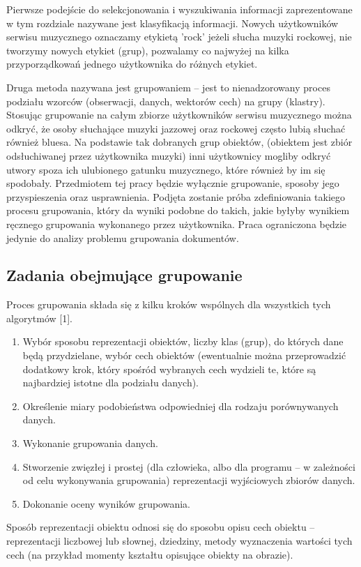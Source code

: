 \documentclass{article}
\begin{document}
Pierwsze podejście do selekcjonowania i wyszukiwania informacji zaprezentowane w tym rozdziale nazywane jest klasyfikacją informacji. Nowych użytkowników serwisu muzycznego oznaczamy etykietą 'rock' jeżeli słucha muzyki rockowej, nie tworzymy nowych etykiet (grup), pozwalamy co najwyżej na kilka przyporządkowań jednego użytkownika do różnych etykiet. 

Druga metoda nazywana jest grupowaniem – jest to nienadzorowany proces podziału wzorców (obserwacji, danych, wektorów cech) na grupy (klastry). Stosując grupowanie na całym zbiorze użytkowników serwisu muzycznego można odkryć, że osoby słuchające muzyki jazzowej oraz rockowej często lubią słuchać również bluesa. Na podstawie tak dobranych grup obiektów, (obiektem jest zbiór odsłuchiwanej przez użytkownika muzyki) inni użytkownicy mogliby odkryć utwory spoza ich ulubionego gatunku muzycznego, które również by im się spodobały.  Przedmiotem tej pracy będzie wyłącznie grupowanie, sposoby jego przyspieszenia oraz usprawnienia. Podjęta zostanie próba zdefiniowania takiego procesu grupowania, który da wyniki podobne do takich, jakie byłyby wynikiem ręcznego grupowania wykonanego przez użytkownika. Praca ograniczona będzie jedynie do analizy problemu grupowania dokumentów.
\subsection{Zadania obejmujące grupowanie}
Proces grupowania składa się z kilku kroków wspólnych dla wszystkich tych algorytmów [1].
\begin{enumerate}
	\item Wybór sposobu reprezentacji obiektów, liczby klas (grup), do których dane będą przydzielane, wybór cech obiektów (ewentualnie można przeprowadzić dodatkowy krok, który spośród wybranych cech wydzieli te, które są najbardziej istotne dla podziału danych).
	\item Określenie miary podobieństwa odpowiedniej dla rodzaju porównywanych danych.
	\item Wykonanie grupowania danych.
	\item Stworzenie zwięzłej i prostej (dla człowieka, albo dla programu – w zależności od celu wykonywania grupowania) reprezentacji wyjściowych zbiorów danych.
	\item Dokonanie oceny wyników grupowania.
\end{enumerate}

Sposób reprezentacji obiektu odnosi się do sposobu opisu cech obiektu – reprezentacji liczbowej lub słownej, dziedziny, metody wyznaczenia wartości tych cech (na przykład momenty kształtu opisujące obiekty na obrazie).
\end{document}
